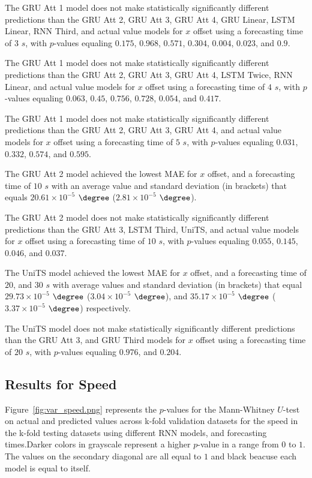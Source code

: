 The GRU Att 1 model does not make statistically significantly different predictions than the GRU Att 2, GRU Att 3, GRU Att 4, GRU Linear, LSTM Linear, RNN Third, and actual value models for $x$ offset using a forecasting time of $3$ $s$, with $p$-values equaling $0.175$, $0.968$, $0.571$, $0.304$, $0.004$, $0.023$, and $0.9$.

The GRU Att 1 model does not make statistically significantly different predictions than the GRU Att 2, GRU Att 3, GRU Att 4, LSTM Twice, RNN Linear, and actual value models for $x$ offset using a forecasting time of $4$ $s$, with $p$-values equaling $0.063$, $0.45$, $0.756$, $0.728$, $0.054$, and $0.417$.

The GRU Att 1 model does not make statistically significantly different predictions than the GRU Att 2, GRU Att 3, GRU Att 4, and actual value models for $x$ offset using a forecasting time of $5$ $s$, with $p$-values equaling $0.031$, $0.332$, $0.574$, and $0.595$.

The GRU Att 2 model achieved the lowest MAE for $x$ offset, and a forecasting time of $10$ $s$ with an average value and standard deviation (in brackets) that equals $20.61 \times 10^{-5}$ $\degree$ ($2.81 \times 10^{-5}$ $\degree$).

The GRU Att 2 model does not make statistically significantly different predictions than the GRU Att 3, LSTM Third, UniTS, and actual value models for $x$ offset using a forecasting time of $10$ $s$, with $p$-values equaling $0.055$, $0.145$, $0.046$, and $0.037$.

The UniTS model achieved the lowest MAE for $x$ offset, and a forecasting time of $20$, and $30$ $s$ with average values and standard deviation (in brackets) that equal $29.73 \times 10^{-5}$ $\degree$ ($3.04 \times 10^{-5}$ $\degree$), and $35.17 \times 10^{-5}$ $\degree$ ($3.37 \times 10^{-5}$ $\degree$) respectively.

The UniTS model does not make statistically significantly different predictions than the GRU Att 3, and GRU Third models for $x$ offset using a forecasting time of $20$ $s$, with $p$-values equaling $0.976$, and $0.204$.

\subsection{Results for Speed}

Figure~\ref{fig:var_speed.png} represents the $p$-values for the Mann-Whitney $U$-test on actual and predicted values across k-fold validation datasets for the speed in the k-fold testing datasets using different RNN models, and forecasting times.Darker colors in grayscale represent a higher $p$-value in a range from $0$ to $1$. The values on the secondary diagonal are all equal to $1$ and black beacuse each model is equal to itself.

